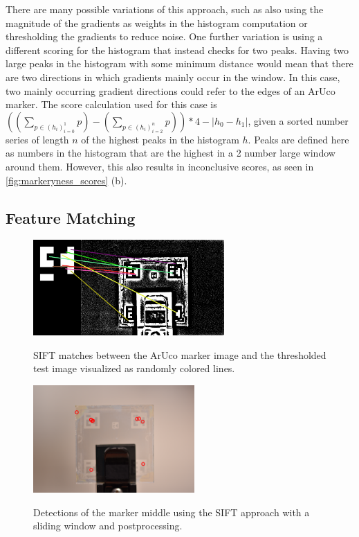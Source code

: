 \documentclass[10pt]{book}
\newcommand{\figurereft}[2]{\autoref{#1} #2}
\begin{document}
There are many possible variations of this approach, such as also using the magnitude of the gradients as weights in the histogram computation or thresholding the gradients to reduce noise. One further variation is using a different scoring for the histogram that instead checks for two peaks. Having two large peaks in the histogram with some minimum distance would mean that there are two directions in which gradients mainly occur in the window. In this case, two mainly occurring gradient directions could refer to the edges of an \ac{ArUco} marker. The score calculation used for this case is $((\sum_{p \in (h_i)^1_{i=0}}p) - (\sum_{p \in (h_i)^n_{i=2}}p)) * 4 - |h_0 - h_1|$, given a sorted number series of length $n$ of the highest peaks in the histogram $h$. Peaks are defined here as numbers in the histogram that are the highest in a 2 number large window around them. However, this also results in inconclusive scores, as seen in \figurereft{fig:markeryness_scores}{(b)}.

\subsection{Feature Matching}

\begin{figure} %
  \caption{\ac{SIFT} matches between the \ac{ArUco} marker image and the thresholded test image visualized as randomly colored lines.}
  \includegraphics[width=0.65\textwidth]{image/classic_sift_matches}
  \label{fig:classic_sift_matches}
\end{figure}

\begin{figure}
  \caption{Detections of the marker middle using the \ac{SIFT} approach with a sliding window and postprocessing.}
  \includegraphics[width=0.55\textwidth]{image/classic_sift_final_matches}
  \label{fig:classic_sift_final_matches}
\end{figure}
\end{document}
